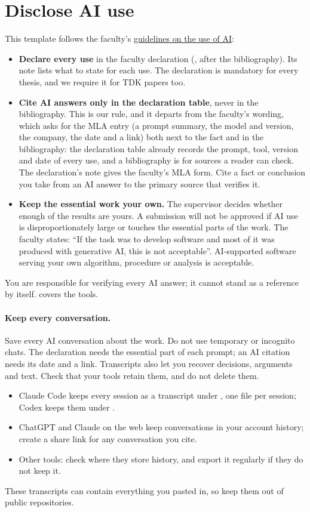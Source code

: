 \section{Disclose AI use}\label{app:writing:ai}
This template follows the faculty's \href{https://vik.bme.hu/page/1346/}{guidelines on the use of AI}:
\begin{itemize}
  \item \textbf{Declare every use} in the faculty declaration (, after the bibliography). Its note lists what to state for each use. The declaration is mandatory for every thesis, and we require it for TDK papers too.
  \item \textbf{Cite AI answers only in the declaration table}, never in the bibliography. This is our rule, and it departs from the faculty's wording, which asks for the MLA entry (a prompt summary, the model and version, the company, the date and a link) both next to the fact and in the bibliography: the declaration table already records the prompt, tool, version and date of every use, and a bibliography is for sources a reader can check. The declaration's note gives the faculty's MLA form. Cite a fact or conclusion you take from an AI answer to the primary source that verifies it.
\end{itemize}
\begin{itemize}
  \item \textbf{Keep the essential work your own.} The supervisor decides whether enough of the results are yours. A submission will not be approved if AI use is disproportionately large or touches the essential parts of the work. The faculty states: \enquote{If the task was to develop software and most of it was produced with generative AI, this is not acceptable}. AI-supported software serving your own algorithm, procedure or analysis is acceptable.
\end{itemize}
You are responsible for verifying every AI answer; it cannot stand as a reference by itself.  covers the tools.

\paragraph{Keep every conversation.} Save every AI conversation about the work. Do not use temporary or incognito chats. The declaration needs the essential part of each prompt; an AI citation needs its date and a link. Transcripts also let you recover decisions, arguments and text. Check that your tools retain them, and do not delete them.
\begin{itemize}[noitemsep]
  \item Claude Code keeps every session as a transcript under , one file per session; Codex keeps them under .
  \item ChatGPT and Claude on the web keep conversations in your account history; create a share link for any conversation you cite.
  \item Other tools: check where they store history, and export it regularly if they do not keep it.
\end{itemize}
These transcripts can contain everything you pasted in, so keep them out of public repositories.

